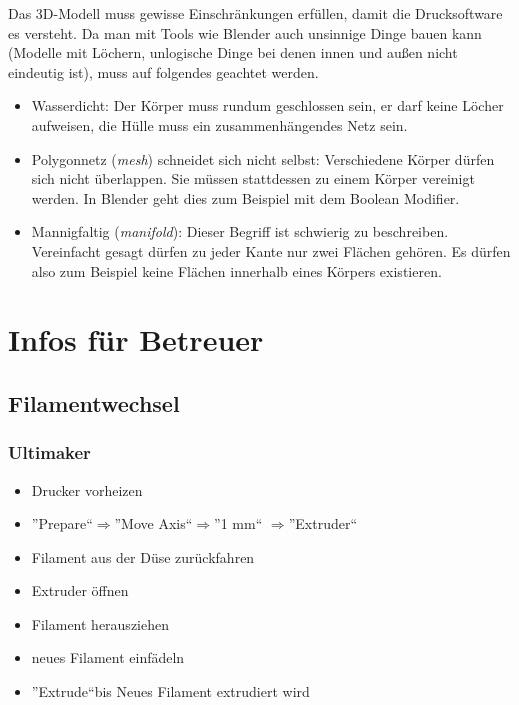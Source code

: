 \documentclass{\basedir/fablab-document}
\newcommand{\fachbegriff}[1]{(\textit{#1})}
\newcommand{\ra}{$\Rightarrow$}
\begin{document}
Das 3D-Modell muss gewisse Einschränkungen erfüllen, damit die Drucksoftware es versteht. Da man mit Tools wie Blender auch unsinnige Dinge bauen kann (Modelle mit Löchern, unlogische Dinge bei denen innen und außen nicht eindeutig ist), muss auf folgendes geachtet werden.
\begin{itemize}
\item Wasserdicht: Der Körper muss rundum geschlossen sein, er darf keine
Löcher aufweisen,  die Hülle muss ein zusammenhängendes Netz sein.
\item Polygonnetz \fachbegriff{mesh} schneidet sich nicht selbst: Verschiedene
Körper dürfen sich nicht überlappen. Sie müssen stattdessen zu einem
Körper vereinigt werden. In Blender geht dies zum Beispiel mit dem
Boolean Modifier.
\item Mannigfaltig \fachbegriff{manifold}: Dieser Begriff ist schwierig zu
beschreiben. Vereinfacht gesagt dürfen zu jeder Kante nur zwei Flächen
gehören. Es dürfen also zum Beispiel keine Flächen innerhalb eines
Körpers existieren.
\end{itemize}


\section{Infos für Betreuer}

\subsection{Filamentwechsel}\label{filamentwechsel}

\subsubsection{Ultimaker}
\begin{itemize}
    \item Drucker vorheizen
    \item ''Prepare``\ra ''Move Axis``\ra ''1 mm`` \ra ''Extruder``
    \item Filament aus der Düse zurückfahren
    \item Extruder öffnen
    \item Filament herausziehen
    \item neues Filament einfädeln
    \item ''Extrude``bis Neues Filament extrudiert wird
\end{itemize}
\end{document}
